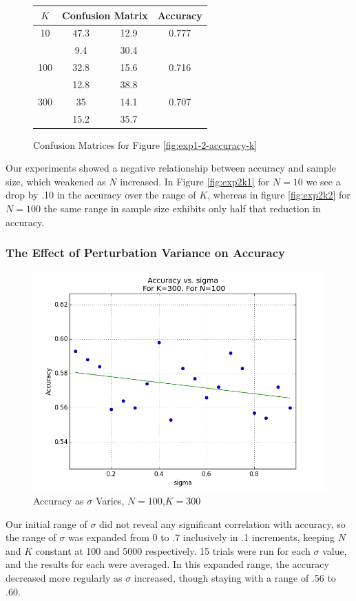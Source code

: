 \documentclass{article}
\begin{document}
\begin{figure}[H]
\centering
\begin{tabular}{|c|c|c|c|}
\hline
$K$&\multicolumn{2}{|c|}{Confusion Matrix}&Accuracy\\
\hline
10&47.3&12.9&0.777\\
\cline{2-3}
&9.4&30.4&\\
\hline
100&32.8&15.6&0.716\\
\cline{2-3}
&12.8&38.8&\\
\hline
300&35&14.1&0.707\\
\cline{2-3}
&15.2&35.7&\\
\hline
\end{tabular}
\caption{Confusion Matrices for Figure \ref{fig:exp1-2-accuracy-k}}\label{fig:cm-exp1-2-accuracy-k}
\end{figure}
Our experiments showed a negative relationship between accuracy and sample size, which weakened as $N$ increased. In Figure \ref{fig:exp2k1} for $N=10$ we see a drop by .10 in the accuracy over the range of $K$, whereas in figure \ref{fig:exp2k2} for $N=100$ the same range in sample size exhibits only half that reduction in accuracy.
\subsubsection{The Effect of Perturbation Variance on Accuracy}
\begin{figure}[H]
    \centering
        \includegraphics[width=\textwidth]{experiment1-2-sigmas.png}
    \caption{Accuracy as $\sigma$ Varies, $N=100$,$K=300$}\label{fig:exp1-2-accuracy-s}
\end{figure}
Our initial range of $\sigma$  did not reveal any significant correlation with accuracy, so the range of $\sigma$ was expanded from 0  to .7 inclusively in .1 increments, keeping $N$ and $K$ constant at 100 and 5000 respectively. 15 trials were run for each $\sigma$ value, and the results for each were averaged. In this expanded range, the accuracy decreased more regularly as $\sigma$ increased, though staying with a range of .56 to .60.
\end{document}
